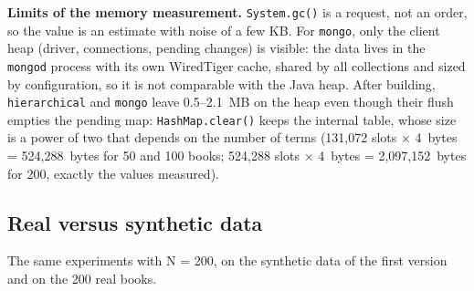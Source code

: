 \documentclass[11pt,a4paper]{article}
\newcommand{\code}[1]{\texttt{#1}}
\begin{document}
\textbf{Limits of the memory measurement.} \code{System.gc()} is a request, not an order, so the
value is an estimate with noise of a few KB. For \code{mongo}, only the client heap (driver,
connections, pending changes) is visible: the data lives in the \code{mongod} process with its own
WiredTiger cache, shared by all collections and sized by configuration, so it is not comparable with
the Java heap. After building, \code{hierarchical} and \code{mongo} leave 0.5--2.1~MB on the heap
even though their flush empties the pending map: \code{HashMap.clear()} keeps the internal table,
whose size is a power of two that depends on the number of terms (131,072 slots $\times$ 4~bytes =
524,288~bytes for 50 and 100 books; 524,288 slots $\times$ 4~bytes = 2,097,152~bytes for 200,
exactly the values measured).

\subsection{Real versus synthetic data}\label{sec:realsyn}
The same experiments with N = 200, on the synthetic data of the first version and on the 200 real
books.
\end{document}
